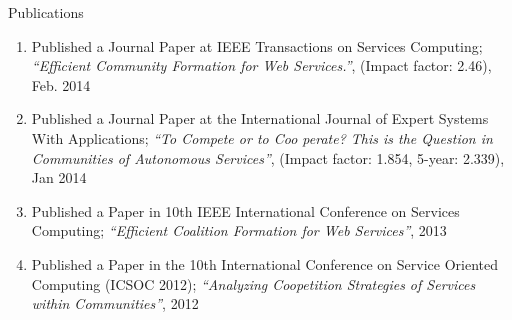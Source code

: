 \documentclass{beamer}
\begin{document}
\begin{frame}{Publications}

    \begin{enumerate}
        \item Published a Journal Paper at IEEE Transactions on Services Computing; \emph{``Efficient Community Formation for Web Services.''}, (Impact factor: 2.46), Feb. 2014
        \item Published a Journal Paper at the International Journal of Expert Systems With Applications; \emph{``To Compete or to Coo perate? This is the Question in Communities of Autonomous Services''},  (Impact factor: 1.854, 5-year: 2.339), Jan 2014
        \item Published a Paper in 10th IEEE International Conference on Services Computing; \emph{``Efficient Coalition Formation for Web Services''}, 2013
        \item Published a Paper in the 10th International Conference on Service Oriented Computing (ICSOC 2012); \emph{``Analyzing Coopetition Strategies of Services within Communities''}, 2012
    \end{enumerate}


\end{frame}

%
\end{document}
